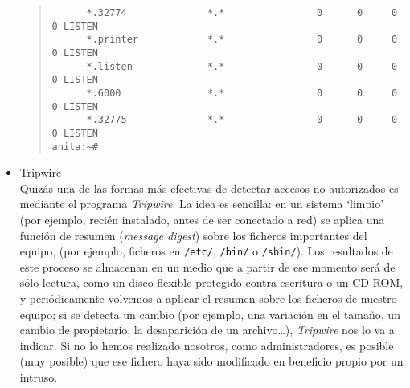 \begin{itemize}
\begin{quote}
\begin{verbatim}
      *.32774              *.*                0      0     0      0 LISTEN
      *.printer            *.*                0      0     0      0 LISTEN
      *.listen             *.*                0      0     0      0 LISTEN
      *.6000               *.*                0      0     0      0 LISTEN
      *.32775              *.*                0      0     0      0 LISTEN
anita:~#
\end{verbatim}
\end{quote}
\rm
\normalsize
\item Tripwire\\
Quiz\'as una de las formas m\'as efectivas de detectar accesos no autorizados 
es mediante el programa {\it Tripwire}. La idea es sencilla: en un sistema 
`limpio' (por ejemplo, reci\'en instalado, antes de ser conectado a red) se 
aplica una funci\'on de resumen ({\it message digest}) sobre los ficheros 
importantes del equipo, (por ejemplo, ficheros en {\tt /etc/}, {\tt /bin/} o 
{\tt /sbin/}). Los resultados de este proceso se almacenan en un medio que a 
partir de ese momento ser\'a de s\'olo lectura, como un disco flexible 
protegido contra escritura o un CD-ROM, y peri\'odicamente volvemos a aplicar 
el resumen sobre los ficheros de nuestro equipo; si se detecta un cambio (por
ejemplo, una variaci\'on en el tama\~no, un cambio de propietario, la
desaparici\'on de un archivo\ldots), {\it Tripwire} nos lo va a indicar. Si no 
lo hemos realizado nosotros, como administradores, es posible (muy posible) que 
ese fichero haya sido modificado en beneficio propio por un intruso.
\end{itemize}
